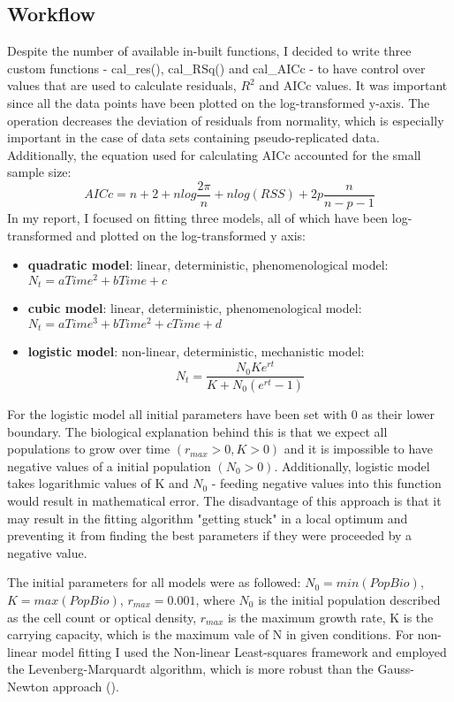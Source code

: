 \documentclass[a4paper,11pt]{article}
\begin{document}
\subsection{Workflow}

Despite the number of available in-built functions, I decided to write three custom functions - cal\_res(), cal\_RSq() and cal\_AICc - to have control over values that are used to calculate residuals, $R^{2}$ and AICc values. It was important since all the data points have been plotted on the log-transformed y-axis. The operation decreases the deviation of residuals from normality, which is especially important in the case of data sets containing pseudo-replicated data. Additionally, the equation used for calculating AICc accounted for the small sample size: 
\begin{equation} 
AICc = n + 2 + nlog\frac{2\pi}{n} + nlog(RSS) + 2p\frac{n}{n-p-1}\end{equation} 
In my report, I focused on fitting three models, all of which have been log-transformed and plotted on the log-transformed y axis:
\begin{itemize}
    \item \textbf{quadratic model}: linear, deterministic, phenomenological model: $N_{t}=aTime^{2}+bTime+c$
    \item \textbf{cubic model}: linear, deterministic, phenomenological model: $N_{t}=aTime^{3}+bTime^{2}+cTime+d$
    \item \textbf{logistic model}: non-linear, deterministic, mechanistic model:\begin{equation} 
    N_{t}=\frac{ N_{0}K e^{rt}}{K + N_{0}(e^{rt}-1)}
    \end{equation} 
\end{itemize}

For the logistic model all initial parameters have been set with 0 as their lower boundary. The biological explanation behind this is that we expect all populations to grow over time $(r_{max} > 0, K>0)$ and it is impossible to have negative values of a initial population $(N_{0}>0)$. Additionally, logistic model takes logarithmic values of K and $N_{0}$ - feeding negative values into this function would result in mathematical error. The disadvantage of this approach is that it may result in the fitting algorithm "getting stuck" in a local optimum and preventing it from finding the best parameters if they were proceeded by a negative value.\par

The initial parameters for all models were as followed: $N_{0}=min(PopBio)$, $K=max(PopBio)$, $r_{max}=0.001$, where $N_{0}$ is the initial population described as the cell count or optical density, $r_{max}$ is the maximum growth rate, K is the carrying capacity, which is the maximum vale of N in given conditions. For non-linear model fitting I used the Non-linear Least-squares framework and employed the Levenberg-Marquardt algorithm, which is more robust than the Gauss-Newton approach (\cite{motulsky2004fitting}).\par
\end{document}
